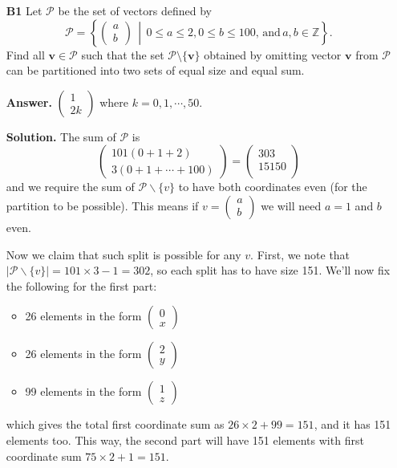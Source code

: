 \documentclass[11pt,a4paper]{article}
\newcommand{\<}{\langle}
\renewcommand{\>}{\rangle}
\begin{document}
\begin{enumerate}
	\item [\textbf{B1}] 
	Let $\mathcal{P}$ be the set of vectors defined by
	\[\mathcal{P} = \left\{\begin{pmatrix} a \\ b \end{pmatrix} \, \middle\vert \, 0 \le a \le 2, 0 \le b \le 100, \, \text{and} \, a, b \in \mathbb{Z}\right\}.\]Find all $\mathbf{v} \in \mathcal{P}$ such that the set $\mathcal{P}\setminus\{\mathbf{v}\}$ obtained by omitting vector $\mathbf{v}$ from $\mathcal{P}$ can be partitioned into two sets of equal size and equal sum.
	
	\textbf{Answer.} $\begin{pmatrix}1 \\ 2k\end{pmatrix}$ where $k=0, 1, \cdots , 50$. 
	
	\textbf{Solution.} The sum of $\mathcal{P}$ is 
	\[
	\begin{pmatrix} 101(0+1+2) \\ 3(0+1+\cdots + 100) \end{pmatrix}
	=\begin{pmatrix}
	303 \\ 15150\\
	\end{pmatrix}
	\]
	and we require the sum of $\mathcal{P}\backslash\{v\}$ to have both coordinates even (for the partition to be possible). This means if $v=\begin{pmatrix}a\\b\end{pmatrix}$ we will need $a=1$ and $b$ even. 
	
	Now we claim that such split is possible for any $v$. First, we note that $|\mathcal{P}\backslash\{v\}|=101\times 3-1=302$, so each split has to have size 151. We'll now fix the following for the first part: 
	\begin{itemize}
		\item 26 elements in the form $\begin{pmatrix}
		0 \\ x
		\end{pmatrix}$
		\item 26 elements in the form $\begin{pmatrix}
		2 \\ y
		\end{pmatrix}$
		\item 99 elements in the form $\begin{pmatrix}
		1 \\ z
		\end{pmatrix}$
	\end{itemize}
	which gives the total first coordinate sum as $26\times 2+99=151$, and it has 151 elements too. This way, the second part will have 151 elements with first coordinate sum $75\times 2+1=151$. 
	

\end{enumerate}
\end{document}
